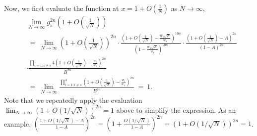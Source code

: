 \documentclass[11pt,reqno]{amsart}
\numberwithin{equation}{section}
\theoremstyle{plain}
\begin{document}
Now, we first evaluate the function at $x=1+O\left(\frac{1}{N}\right)$ as $N\rightarrow\infty$,
\begin{align}
&\lim_{N\rightarrow\infty}g_s^{2n}\left(1+O\left(\frac{1}{\sqrt{N}}\right)\right) \nonumber \\ 
&\ = \ \lim_{N\rightarrow\infty}\left(1+O\left(\frac{1}{\sqrt{N}}\right)\right)^{2n}\cdot \frac{\left(1+O\left(\frac{1}{\sqrt{N}}\right)-\frac{w_5\sqrt{N}}{w_s}\right)^{10n}}{\left(1-\frac{w_5\sqrt{N}}{w_s}\right)^{10n}}\cdot \frac{\left(1+O\left(\frac{1}{\sqrt{N}}\right)-A\right)^{2n}}{(1-A)^{2n}} \nonumber\\
& \cdot \frac{\prod_{i=1;i\neq s}{4}\left(1+O\left(\frac{1}{\sqrt{N}}\right)-\frac{w_i}{w_s}\right)^{2n}}{B^{2n}} \nonumber\\
&\ = \ \lim_{N\rightarrow\infty} \frac{\prod_{i=1;i\neq s}^4\left(1+O\left(\frac{1}{\sqrt{N}}\right)-\frac{w_i}{w_s}\right)^{2n}}{B^{2n}} \ = \ 1.
\end{align}
Note that we repeatedly apply the evaluation $\lim_{N\rightarrow\infty}(1+O(1/\sqrt{N}))^{2n}=1$ above to simplify the expression. As an example, $\left(\frac{1+O(1/\sqrt{N})-A}{1-A}\right)^{2n}=\left(1+\frac{O(1/\sqrt{N})}{1-A}\right)^{2n}=\left(1+O(1/\sqrt{N})\right)^{2n}=1$.
\end{document}
